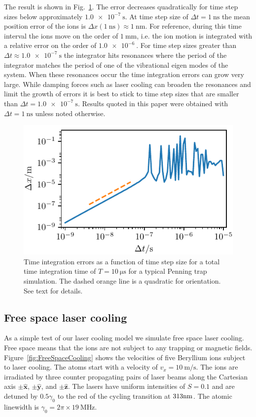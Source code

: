 \documentclass[aps, pra, preprint]{revtex4-1}
\begin{document}
The result is shown in Fig.~\ref{fig:convergence}. The error
decreases quadratically for time step sizes below approximately
$\SI{1.0e-7}{\second}$. At time step size of $\Delta t =
\SI{1}{\nano\second}$ the mean position error of the ions is
$\Delta x(\SI{1}{\nano\second})\approx \SI{1}{\nano\meter}$. For
reference, during this time interval the ions move on the order
of $\SI{1}{\milli\meter}$, i.e. the ion motion is integrated with
a relative error on the order of $\SI{1.0e-6}{}$. For time step
sizes greater than $\Delta t\approx \SI{1.0e-7}{\second}$ the
integrator hits resonances where the period of the integrator
matches the period of one of the vibrational eigen modes of the system.
When these resonances occur the time integration errors can grow
very large. While damping forces such as laser cooling can
broaden the resonances and limit the growth of errors it is best
to stick to time step sizes that are smaller than $\Delta t =
\SI{1.0e-7}{\second}$. Results quoted in this paper were obtained
with $\Delta t = \SI{1}{\nano\second}$ unless noted otherwise.
\begin{figure}
  \includegraphics{./figures/fig_convergence.pdf}
  \caption{Time integration errors as a function of time step
    size for a total time integration time of $T=\SI{10}{\us}$
    for a typical Penning trap simulation. The dashed orange line
    is a quadratic for orientation. See text for details.}
  \label{fig:convergence}
\end{figure}


\subsection{Free space laser cooling}

As a simple test of our laser cooling model we simulate free
space laser cooling. Free space means that the ions are not
subject to any trapping or magnetic fields.
Figure~\ref{fig:FreeSpaceCooling} shows the velocities of five
Beryllium ions subject to laser cooling. The atoms start with a
velocity of $v_x=\SI{10}{\meter/\second}$. The ions are
irradiated by three counter propagating pairs of laser beams
along the Cartesian axis $\pm\hat{\mathbf{x}}$,
$\pm\hat{\mathbf{y}}$, and $\pm\hat{\mathbf{z}}$. The lasers have
uniform intensities of $S=0.1$ and are detuned by $0.5\gamma_0$
to the red of the cycling transition at $313{\rm nm}$. The atomic
linewidth is $\gamma_0=2\pi\times \SI{19}{\mega\hertz}$.
\end{document}
